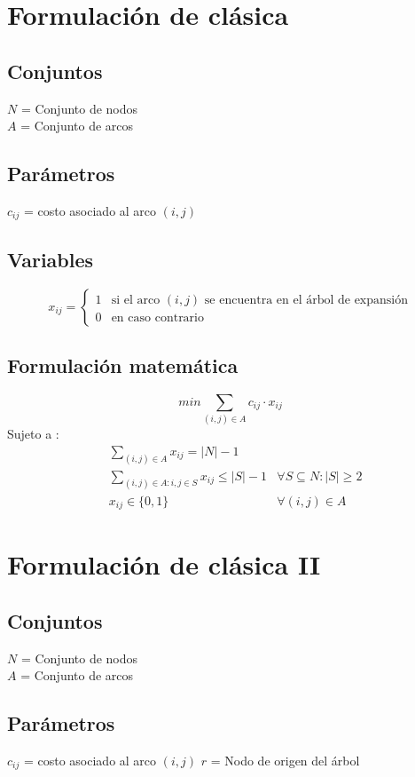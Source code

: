 \documentclass{article}
\numberwithin{equation}{section}
\begin{document}
\section{Formulación de clásica}
\subsection{Conjuntos}
$N$ = Conjunto de nodos\\
$A$ = Conjunto de arcos
\subsection{Parámetros}
$c_{ij}$ = costo asociado al arco $(i,j)$
\subsection{Variables}
\begin{flushleft}
\[x_{ij}={\begin{cases}1&{\mbox{si el arco $(i,j)$ se encuentra en el árbol de expansión}}\\0&{\mbox{en caso contrario}}\end{cases}}
\]
\end{flushleft}
\subsection{Formulación matemática}
\begin{equation}
min \sum_{(i,j) \in A} c_{ij} \cdot x_{ij}
\end{equation}
Sujeto a : \begin{align}
& \sum_{(i,j) \in A} x_{ij} = |N| - 1\\
& \sum_{(i,j) \in A: i,j \in S} x_{ij} \leq |S| - 1 &\forall S \subseteq N : |S| \geq 2 \\
& x_{ij} \in \{0,1\} &\forall (i,j) \in A
\end{align}

\section{Formulación de clásica II}
\subsection{Conjuntos}
$N$ = Conjunto de nodos\\
$A$ = Conjunto de arcos
\subsection{Parámetros}
$c_{ij}$ = costo asociado al arco $(i,j)$
$r$ = Nodo de origen del árbol
\end{document}
